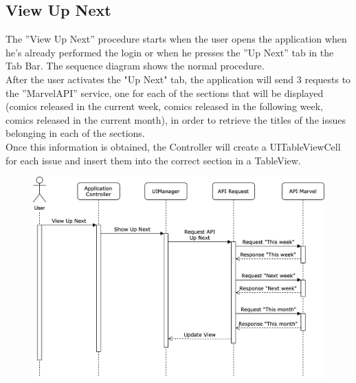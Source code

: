 \clearpage

\subsection{View Up Next}
The ”View Up Next” procedure starts when the user opens the application when he's already performed the login or when he presses the ”Up Next” tab in the Tab Bar. The sequence diagram shows the normal procedure. \\
After the user activates the "Up Next" tab, the application will send 3 requests to the ”MarvelAPI” service, one for each of the sections that will be displayed (comics released in the current week, comics released in the following week, comics released in the current month), in order to retrieve the titles of the issues belonging in each of the sections. \\
Once this information is obtained, the Controller will create a UITableViewCell for each issue and insert them into the correct section in a TableView. 

\vspace{5mm}

\begin{figure}[h]
\centering
\includegraphics[width=\textwidth]{img/seqdiagrams/viewupnext}
\end{figure}

\clearpage

